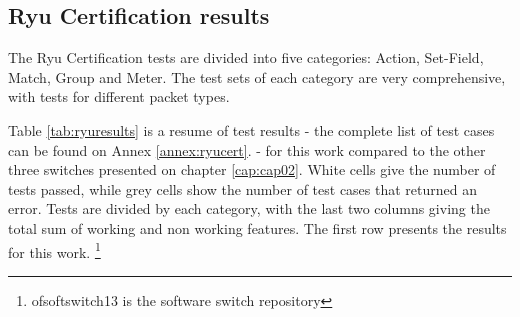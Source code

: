 \subsection{Ryu Certification results}

The Ryu Certification tests are divided into five categories: Action, Set-Field, Match, Group and Meter. The test sets of each category are very comprehensive, with tests for different packet types.

Table \ref{tab:ryuresults} is a resume of test results - the complete list of test cases can be found on Annex \ref{annex:ryucert}.  - for this work compared to the other three switches presented on chapter \ref{cap:cap02}. White cells give the number of tests passed, while grey cells show the number of test cases that returned an error. Tests are divided by each category, with the last two columns giving the total sum of working and non working features. The first row presents the results for this work. \footnote{ofsoftswitch13 is the software switch repository} 

\begin{table}[h]
\centering
\caption{Ryu Certification results comparison}
\label{tab:ryuresults}
\end{table}

